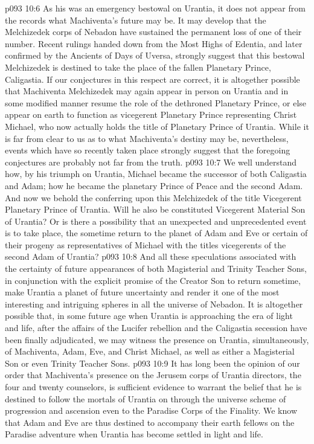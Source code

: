 \vs p093 10:6 As his was an emergency bestowal on Urantia, it does not appear from the records what Machiventa’s future may be. It may develop that the Melchizedek corps of Nebadon have sustained the permanent loss of one of their number. Recent rulings handed down from the Most Highs of Edentia, and later confirmed by the Ancients of Days of Uversa, strongly suggest that this bestowal Melchizedek is destined to take the place of the fallen Planetary Prince, Caligastia. If our conjectures in this respect are correct, it is altogether possible that Machiventa Melchizedek may again appear in person on Urantia and in some modified manner resume the role of the dethroned Planetary Prince, or else appear on earth to function as vicegerent Planetary Prince representing Christ Michael, who now actually holds the title of Planetary Prince of Urantia. While it is far from clear to us as to what Machiventa’s destiny may be, nevertheless, events which have so recently taken place strongly suggest that the foregoing conjectures are probably not far from the truth.
\vs p093 10:7 We well understand how, by his triumph on Urantia, Michael became the successor of both Caligastia and Adam; how he became the planetary Prince of Peace and the second Adam. And now we behold the conferring upon this Melchizedek of the title Vicegerent Planetary Prince of Urantia. Will he also be constituted Vicegerent Material Son of Urantia? Or is there a possibility that an unexpected and unprecedented event is to take place, the sometime return to the planet of Adam and Eve or certain of their progeny as representatives of Michael with the titles vicegerents of the second Adam of Urantia?\plusone
\vs p093 10:8 And all these speculations associated with the certainty of future appearances of both Magisterial and Trinity Teacher Sons, in conjunction with the explicit promise of the Creator Son to return sometime, make Urantia a planet of future uncertainty and render it one of the most interesting and intriguing spheres in all the universe of Nebadon. It is altogether possible that, in some future age when Urantia is approaching the era of light and life, after the affairs of the Lucifer rebellion and the Caligastia secession have been finally adjudicated, we may witness the presence on Urantia, simultaneously, of Machiventa, Adam, Eve, and Christ Michael, as well as either a Magisterial Son or even Trinity Teacher Sons.
\vs p093 10:9 It has long been the opinion of our order that Machiventa’s presence on the Jerusem corps of Urantia directors, the four and twenty counselors, is sufficient evidence to warrant the belief that he is destined to follow the mortals of Urantia on through the universe scheme of progression and ascension even to the Paradise Corps of the Finality. We know that Adam and Eve are thus destined to accompany their earth fellows on the Paradise adventure when Urantia has become settled in light and life.
